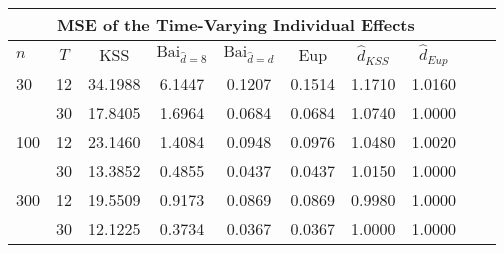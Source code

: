 \begin{tabular}{lccccccccc} 
\hline \multicolumn{8}{c}{MSE of the Time-Varying Individual Effects} \\ \hline 
$n$ & $T$ & KSS & $ \text{Bai}_{\hat{d} = 8}$ & $\text{Bai}_{\hat{d} = d}$ & Eup & $\hat{d}_{KSS}$ & $\hat{d}_{Eup}$ \\
\hline
30 & 12 &  34.1988  &  6.1447  &  0.1207  &  0.1514  &  1.1710  &  1.0160  \\
& 30 &  17.8405  &  1.6964  &  0.0684  &  0.0684  &  1.0740  &  1.0000  \\
100 & 12 &  23.1460  &  1.4084  &  0.0948  &  0.0976  &  1.0480  &  1.0020  \\
& 30 &  13.3852  &  0.4855  &  0.0437  &  0.0437  &  1.0150  &  1.0000  \\
300 & 12 &  19.5509  &  0.9173  &  0.0869  &  0.0869  &  0.9980  &  1.0000  \\
& 30 &  12.1225  &  0.3734  &  0.0367  &  0.0367  &  1.0000  &  1.0000  \\
\end{tabular} 
